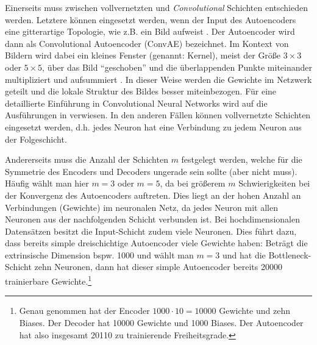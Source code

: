 Einerseits muss zwischen vollvernetzten und \textit{Convolutional} Schichten entschieden werden.
Letztere können eingesetzt werden, wenn der Input des Autoencoders eine gitterartige Topologie, wie
z.B. ein Bild aufweist \parencite[330]{Goodfellow.2016}.
Der Autoencoder wird dann als Convolutional Autoencoder (ConvAE) bezeichnet. Im Kontext von Bildern
wird dabei ein kleines Fenster (genannt: Kernel), meist der Größe $3 \times 3$ oder $5 \times 5$,
über das Bild \enquote{geschoben} und die überlappenden Punkte miteinander multipliziert und
aufsummiert \parencite[333]{Goodfellow.2016}. In dieser Weise werden die Gewichte im Netzwerk geteilt und die
lokale Struktur des Bildes besser miteinbezogen. Für eine detaillierte Einführung in Convolutional
Neural Networks wird auf die Ausführungen in \textcite[330 -- 372]{Goodfellow.2016} verwiesen. In
den anderen Fällen können vollvernetzte Schichten eingesetzt werden, d.h. jedes Neuron hat eine
Verbindung zu jedem Neuron aus der Folgeschicht.

Andererseits muss die Anzahl der Schichten $m$ festgelegt werden, welche für die Symmetrie des
Encoders und Decoders ungerade sein sollte (aber nicht muss). Häufig wählt man hier $m = 3$ oder $m
	= 5$, da bei größerem $m$ Schwierigkeiten bei der Konvergenz des Autoencoders auftreten. Dies liegt
an der hohen Anzahl an Verbindungen (Gewichte) im neuronalen Netz, da jedes Neuron mit allen
Neuronen aus der nachfolgenden Schicht verbunden ist. Bei hochdimensionalen Datensätzen besitzt die
Input-Schicht zudem viele Neuronen. Dies führt dazu, dass bereits simple dreischichtige Autoencoder
viele Gewichte haben: Beträgt die extrinsische Dimension bspw. 1000 und wählt man $m=3$ und hat die
Bottleneck-Schicht zehn Neuronen, dann hat dieser simple Autoencoder bereits \num{20000}
trainierbare Gewichte.\footnote{Genau genommen hat der Encoder $1000 \cdot 10 = \num{10000}$
	Gewichte und zehn Biases. Der Decoder hat \num{10000} Gewichte und \num{1000} Biases. Der
	Autoencoder hat also insgesamt \num{20110} zu trainierende Freiheitsgrade.}

